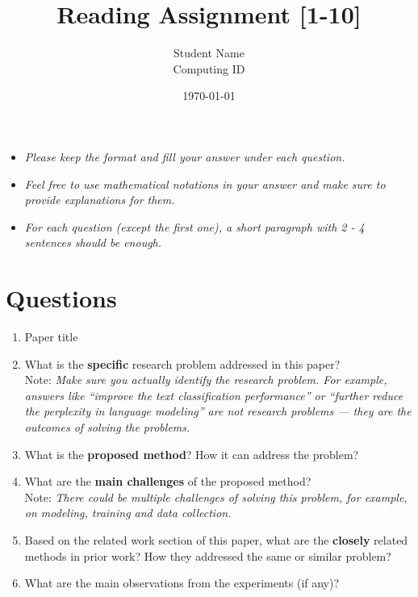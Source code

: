 \documentclass[12pt]{article}
\title{Reading Assignment [1-10]}
\author{Student Name\\ Computing ID}
\date{\today}
\begin{document}
 
\maketitle


\begin{itemize}
\item {\it Please keep the format and fill your answer under each question.}
\item {\it Feel free to use mathematical notations in your answer and make sure to provide explanations for them.}
\item {\it For each question (except the first one), a short paragraph with 2 - 4 sentences should be enough.}
\end{itemize}

\section*{Questions}

\begin{enumerate}
\item Paper title
\item What is the {\bf specific} research problem addressed in this paper?\\
  Note: {\it Make sure you actually identify the research problem. For example, answers like ``improve the text classification performance'' or ``further reduce the perplexity in language modeling'' are not research problems --- they are the outcomes of solving the problems.}
\item What is the {\bf proposed method}? How it can address the problem?
\item What are the {\bf main challenges} of the proposed method?\\
  Note: {\it There could be multiple challenges of solving this problem, for example, on modeling, training and data collection.}
\item Based on the related work section of this paper, what are the {\bf closely} related methods in prior work? How they addressed the same or similar problem?
\item What are the main observations from the experiments (if any)?
\end{enumerate}
\end{document}
